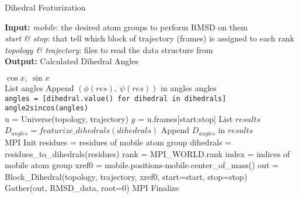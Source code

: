 \begin{algorithm}[ht!]
	\scriptsize
	\caption{Dihedral Featurization}
	\label{alg:Dihedral}
	\hspace*{\algorithmicindent} \textbf{Input:} \emph{mobile}: the desired atom groups to perform RMSD on them \\ 
	\hspace*{\algorithmicindent} \emph{start \& stop}: that tell which block of trajectory (frames) is assigned to each rank \\
	\hspace*{\algorithmicindent} \emph{topology \& trajectory}: files to read the data structure from \\
	\hspace*{\algorithmicindent} \textbf{Output:} Calculated Dihedral Angles
	\begin{algorithmic}[1]
		\State \Return $\cos{x},\: \sin{x}$
		\EndProcedure
		\\
		\State List angles
		\State Append $(\phi (res),\: \psi (res))$ in angles
		\EndFor
		\State \Return angles
		\EndProcedure
		\\
		\State \texttt{angles = [dihedral.value() for dihedral in dihedrals]}
		\State \Return \texttt{angle2sincos(angles)}
		\EndProcedure
		\\
		\State u = Universe(topology, trajectory)
		\State $g$ = u.frames[start:stop] 
		\State List $results$
		\State $D_{angles}=featurize\_dihedrals(dihedrals)$
		\State Append $D_{angles}$ in $results$ 
		\EndFor
		\EndProcedure
		\\      
		\State MPI Init 
		\State residues = residues of mobile atom group
		\State dihedrals = residues\_to\_dihedrals(residues)
		\State rank = MPI\_WORLD.rank
		\State index = indices of mobile atom group
		\State xref0 = mobile.positions-mobile.center\_of\_mass()
		\State out = Block\_Dihedral(topology, trajectory, xref0, start=start, stop=stop)
		\\
		\State Gather(out, RMSD\_data, root=0)
		\State MPI Finalize
	\end{algorithmic}
\end{algorithm}


